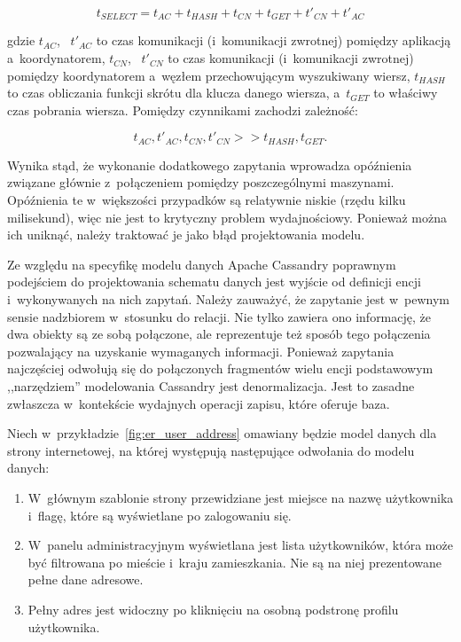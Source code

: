 \begin{equation}
	t_{SELECT} = t_{AC} + t_{HASH} + t_{CN} + t_{GET} + t'_{CN} + t'_{AC}
	\label{eq:select_time}
\end{equation}

gdzie $t_{AC}$, ~$t'_{AC}$ to czas komunikacji (i~komunikacji zwrotnej) pomiędzy aplikacją a~koordynatorem, $t_{CN}$, ~$t'_{CN}$ to czas komunikacji (i~komunikacji zwrotnej) pomiędzy koordynatorem a~węzłem przechowującym wyszukiwany wiersz, $t_{HASH}$ to czas obliczania funkcji skrótu dla klucza danego wiersza, a~$t_{GET}$ to właściwy czas pobrania wiersza. Pomiędzy czynnikami zachodzi zależność:

\begin{equation}
 t_{AC}, t'_{AC}, t_{CN}, t'_{CN} >> t_{HASH}, t_{GET}.
\end{equation}

Wynika stąd, że wykonanie dodatkowego zapytania wprowadza opóźnienia związane głównie z~połączeniem pomiędzy poszczególnymi maszynami. Opóźnienia te w~większości przypadków są relatywnie niskie (rzędu kilku milisekund), więc nie jest to krytyczny problem wydajnościowy. Ponieważ można ich uniknąć, należy traktować je jako błąd projektowania modelu.

Ze względu na specyfikę modelu danych Apache Cassandry poprawnym podejściem do projektowania schematu danych jest wyjście od definicji encji i~wykonywanych na nich zapytań. Należy zauważyć, że zapytanie jest w~pewnym sensie nadzbiorem w~stosunku do relacji. Nie tylko zawiera ono informację, że dwa obiekty są ze sobą połączone, ale reprezentuje też sposób tego połączenia pozwalający na uzyskanie wymaganych informacji. Ponieważ zapytania najczęściej odwołują się do połączonych fragmentów wielu encji podstawowym ,,narzędziem'' modelowania Cassandry jest denormalizacja. Jest to zasadne zwłaszcza w~kontekście wydajnych operacji zapisu, które oferuje baza.

Niech w~przykładzie~\ref{fig:er_user_address} omawiany będzie model danych dla strony internetowej, na której występują następujące odwołania do modelu danych:

\begin{enumerate}
	\item \label{enum:username_flag} W~głównym szablonie strony przewidziane jest miejsce na nazwę użytkownika i~flagę, które są wyświetlane po zalogowaniu się.
	\item \label{enum:user_city_country} W~panelu administracyjnym wyświetlana jest lista użytkowników, która może być filtrowana po mieście i~kraju zamieszkania. Nie są na niej prezentowane pełne dane adresowe.
	\item \label{enum:full_address} Pełny adres jest widoczny po kliknięciu na osobną podstronę profilu użytkownika.
\end{enumerate}

